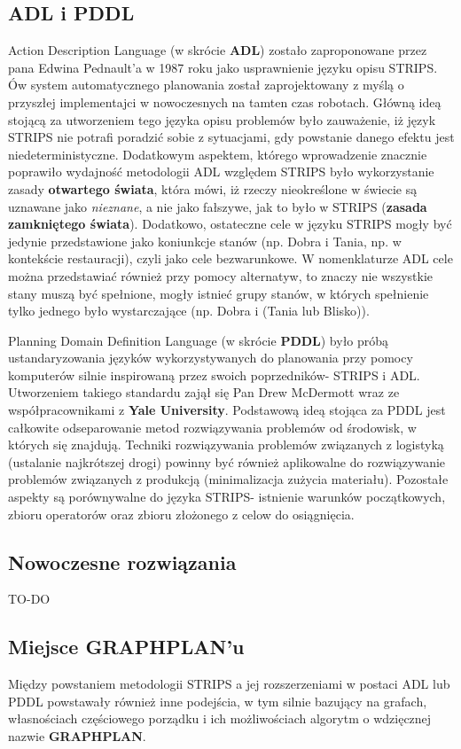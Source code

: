     \subsection{ADL i PDDL}
    Action Description Language (w skrócie \textbf{ADL}) zostało zaproponowane przez pana Edwina Pednault'a  w 1987 roku jako usprawnienie 
    języku opisu STRIPS. Ów system automatycznego planowania został zaprojektowany z myślą o przyszłej implementajci w nowoczesnych na tamten czas robotach.
    Główną ideą stojącą za utworzeniem tego języka opisu problemów było zauważenie, iż język STRIPS nie potrafi poradzić sobie z sytuacjami, gdy
    powstanie danego efektu jest niedeterministyczne. Dodatkowym aspektem, którego wprowadzenie znacznie poprawiło wydajność metodologii ADL względem STRIPS 
    było wykorzystanie zasady \textbf{otwartego świata}, która mówi, iż rzeczy nieokreślone w świecie są uznawane jako \textit{nieznane}, a nie jako 
    fałszywe, jak to było w STRIPS (\textbf{zasada zamkniętego świata}). Dodatkowo, ostateczne cele w języku STRIPS mogły być jedynie przedstawione jako 
    koniunkcje stanów (np. Dobra i Tania, np. w kontekście restauracji), czyli jako cele bezwarunkowe. 
    W nomenklaturze ADL cele można przedstawiać również przy pomocy alternatyw, to znaczy 
    nie wszystkie stany muszą być spełnione, mogły istnieć grupy stanów, w których spełnienie tylko jednego było wystarczające (np. Dobra i (Tania lub Blisko)). 

    Planning Domain Definition Language (w skrócie \textbf{PDDL}) było próbą ustandaryzowania języków wykorzystywanych 
    do planowania przy pomocy komputerów silnie inspirowaną przez swoich poprzedników- STRIPS i ADL. 
    Utworzeniem takiego standardu zajął się Pan Drew McDermott wraz ze współpracownikami z \textbf{Yale University}.
    Podstawową ideą stojąca za PDDL jest całkowite odseparowanie metod rozwiązywania problemów od środowisk, w których się 
    znajdują. Techniki rozwiązywania problemów związanych z logistyką (ustalanie najkrótszej drogi) powinny być również aplikowalne do rozwiązywanie problemów 
    związanych z produkcją (minimalizacja zużycia materiału). Pozostałe aspekty są porównywalne do języka STRIPS- 
    istnienie warunków początkowych, zbioru operatorów oraz zbioru złożonego z celow do osiągnięcia.



    \subsection{Nowoczesne rozwiązania}
    TO-DO
    
    \subsection{Miejsce GRAPHPLAN'u}
    Między powstaniem metodologii STRIPS a jej rozszerzeniami w postaci ADL lub PDDL powstawały również inne podejścia, w tym silnie 
    bazujący na grafach, własnościach częściowego porządku i ich możliwościach algorytm o wdzięcznej nazwie \textbf{GRAPHPLAN}.






